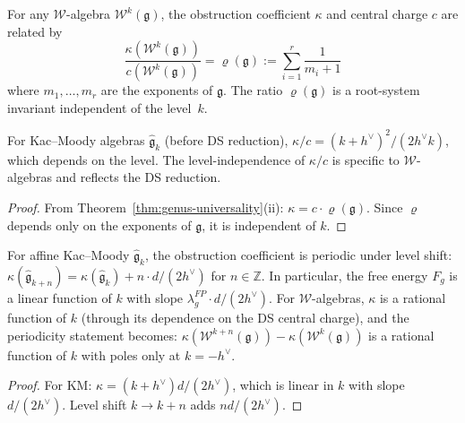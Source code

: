 \begin{corollary}
\label{cor:anomaly-ratio}
For any $\mathcal{W}$-algebra $\mathcal{W}^k(\mathfrak{g})$, the obstruction coefficient $\kappa$ and central charge $c$ are related by
\begin{equation}\label{eq:anomaly-ratio}
\frac{\kappa(\mathcal{W}^k(\mathfrak{g}))}{c(\mathcal{W}^k(\mathfrak{g}))} = \varrho(\mathfrak{g}) := \sum_{i=1}^r \frac{1}{m_i + 1}
\end{equation}
where $m_1, \ldots, m_r$ are the exponents of $\mathfrak{g}$.  The ratio $\varrho(\mathfrak{g})$ is a root-system invariant independent of the level~$k$.

For Kac--Moody algebras $\widehat{\mathfrak{g}}_k$ (before DS reduction), $\kappa/c = (k+h^\vee)^2/(2h^\vee k)$, which depends on the level.  The level-independence of $\kappa/c$ is specific to $\mathcal{W}$-algebras and reflects the DS reduction.
\end{corollary}

\begin{proof}
From Theorem~\ref{thm:genus-universality}(ii): $\kappa = c \cdot \varrho(\mathfrak{g})$.  Since $\varrho$ depends only on the exponents of $\mathfrak{g}$, it is independent of $k$.
\end{proof}

\begin{corollary}
\label{cor:kappa-periodicity}
For affine Kac--Moody $\widehat{\mathfrak{g}}_k$, the obstruction coefficient is periodic under level shift: $\kappa(\widehat{\mathfrak{g}}_{k+n}) = \kappa(\widehat{\mathfrak{g}}_k) + n \cdot d/(2h^\vee)$ for $n \in \mathbb{Z}$.  In particular, the free energy $F_g$ is a linear function of $k$ with slope $\lambda_g^{FP} \cdot d/(2h^\vee)$.  For $\mathcal{W}$-algebras, $\kappa$ is a rational function of $k$ (through its dependence on the DS central charge), and the periodicity statement becomes: $\kappa(\mathcal{W}^{k+n}(\mathfrak{g})) - \kappa(\mathcal{W}^k(\mathfrak{g}))$ is a rational function of $k$ with poles only at $k = -h^\vee$.
\end{corollary}

\begin{proof}
For KM: $\kappa = (k+h^\vee)d/(2h^\vee)$, which is linear in $k$ with slope $d/(2h^\vee)$.  Level shift $k \to k+n$ adds $nd/(2h^\vee)$.
\end{proof}

